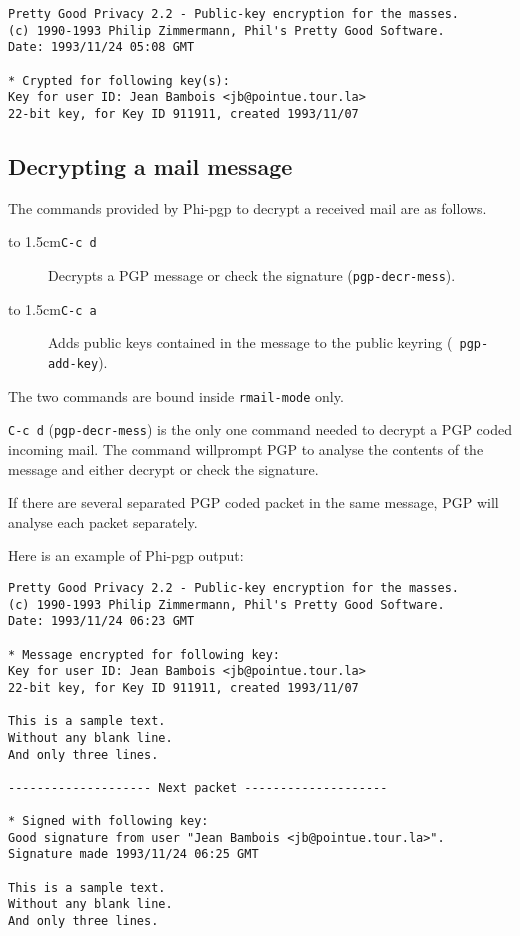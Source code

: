 \begin{verbatim}
Pretty Good Privacy 2.2 - Public-key encryption for the masses.
(c) 1990-1993 Philip Zimmermann, Phil's Pretty Good Software.
Date: 1993/11/24 05:08 GMT

* Crypted for following key(s):
Key for user ID: Jean Bambois <jb@pointue.tour.la>
22-bit key, for Key ID 911911, created 1993/11/07
\end{verbatim}

\subsection{Decrypting a mail message}

The commands provided  by Phi-pgp to decrypt  a  received mail are  as
follows.

{\leftmargini 2cm %
\begin{description}
\item[\hbox to 1.5cm{\tt C-c  d\hfill}]
Decrypts a PGP message or check the signature ({\tt pgp-decr-mess}).

\item[\hbox to 1.5cm{\tt C-c  a\hfill}]
Adds public keys contained in the message to the public keyring ({\tt
pgp-add-key}).
\end{description}}

The two commands are bound inside {\tt rmail-mode} only.

{\tt C-c d}  ({\tt pgp-decr-mess}) is  the only one  command needed to
decrypt  a  PGP  coded  incoming mail. The  command willprompt   PGP to analyse  the contents  of  the
message and either decrypt or check the signature.

If there are several  separated PGP coded packet  in the same message,
PGP will analyse each packet separately.

Here is an example of Phi-pgp output:

\begin{verbatim}
Pretty Good Privacy 2.2 - Public-key encryption for the masses.
(c) 1990-1993 Philip Zimmermann, Phil's Pretty Good Software.
Date: 1993/11/24 06:23 GMT

* Message encrypted for following key:
Key for user ID: Jean Bambois <jb@pointue.tour.la>
22-bit key, for Key ID 911911, created 1993/11/07

This is a sample text.
Without any blank line.
And only three lines.

-------------------- Next packet --------------------

* Signed with following key:
Good signature from user "Jean Bambois <jb@pointue.tour.la>".
Signature made 1993/11/24 06:25 GMT

This is a sample text.
Without any blank line.
And only three lines.
\end{verbatim}

